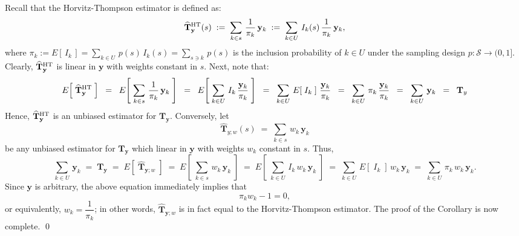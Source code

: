 \proof
Recall that the Horvitz-Thompson estimator is defined as:
\begin{equation*}
\widehat{\mathbf{T}}^{\textnormal{HT}}_{\mathbf{y}}(s)
\;:=\; \sum_{k \in s}\,\dfrac{1}{\pi_{k}}\,\mathbf{y}_{k}
\;:=\; \sum_{k \in U}\,I_{k}(s)\,\dfrac{1}{\pi_{k}}\,\mathbf{y}_{k},
\end{equation*}
where $\pi_{k} := E\!\left[\,I_{k}\,\right] = \underset{k \in U}{\sum}\,p(s)\,I_{k}(s) = \underset{s \ni k}{\sum}\,p(s)$
is the inclusion probability of $k \in U$ under the sampling design $p : \mathcal{S} \longrightarrow (0,1]$.
Clearly, $\widehat{\mathbf{T}}^{\textnormal{HT}}_{\mathbf{y}}$ is linear in $\mathbf{y}$ with weights constant in $s$.
Next, note that:
\begin{equation*}
E\!\left[\;\widehat{\mathbf{T}}^{\textnormal{HT}}_{\mathbf{y}}\;\right]
\;\;=\;\; E\!\left[\;\sum_{k \in s}\,\dfrac{1}{\pi_{k}}\,\mathbf{y}_{k}\;\right]
\;\;=\;\; E\!\left[\;\sum_{k \in U}\,I_{k}\,\dfrac{\mathbf{y}_{k}}{\pi_{k}}\;\right]
\;\;=\;\; \sum_{k \in U}\,E\!\left[\;I_{k}\;\right]\,\dfrac{\mathbf{y}_{k}}{\pi_{k}}
\;\;=\;\; \sum_{k \in U}\,\pi_{k}\,\dfrac{\mathbf{y}_{k}}{\pi_{k}}
\;\;=\;\; \sum_{k \in U}\,\mathbf{y}_{k} \;\; = \;\; \mathbf{T}_{y}
\end{equation*}
Hence, $\widehat{\mathbf{T}}^{\textnormal{HT}}_{\mathbf{y}}$ is an unbiased estimator for $\mathbf{T}_{\mathbf{y}}$.
Conversely, let
\begin{equation*}
\widehat{\mathbf{T}}_{y;w}(s) \; = \; \sum_{k \in s}\,w_{k}\,\mathbf{y}_{k}
\end{equation*}
be any unbiased estimator for $\mathbf{T}_{\mathbf{y}}$ which linear in $\mathbf{y}$ with weights $w_{k}$ constant in $s$.
Thus,
\begin{equation*}
\sum_{k \in U}\,\mathbf{y}_{k}
\;=\; \mathbf{T}_{\mathbf{y}}
\;=\; E\!\left[\;\widehat{\mathbf{T}}_{\mathbf{y};w}\;\right]
\;=\; E\!\left[\;\sum_{k \in s}\,w_{k}\,\mathbf{y}_{k}\;\right]
\;=\; E\!\left[\;\sum_{k \in U}\,I_{k}\,w_{k}\,\mathbf{y}_{k}\;\right]
\;=\; \sum_{k \in U}\,E\!\left[\;I_{k}\;\right]\,w_{k}\,\mathbf{y}_{k}
\;=\; \sum_{k \in U}\,\pi_{k}\,w_{k}\,\mathbf{y}_{k}.
\end{equation*}
Since $\mathbf{y}$ is arbitrary, the above equation immediately implies that
\begin{equation*}
\pi_{k}w_{k} - 1 = 0,
\end{equation*}
or equivalently, $w_{k} = \dfrac{1}{\pi_{k}}$; in other words,
$\widehat{\mathbf{T}}_{\mathbf{y};w}$ is in fact equal to the Horvitz-Thompson estimator.
The proof of the Corollary is now complete.
\qed

